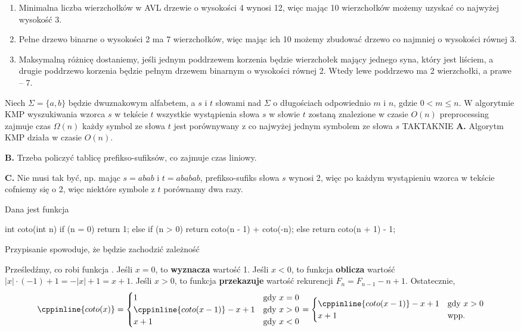 \begin{solutions}
    \begin{enumerate}[\bf A.]
        \item Minimalna liczba wierzchołków w AVL drzewie o wysokości 4 wynosi 12, więc mając 10 wierzchołków możemy uzyskać co najwyżej wysokość 3.

        \item Pełne drzewo binarne o wysokości 2 ma 7 wierzchołków, więc mając ich 10 możemy zbudować drzewo co najmniej o wysokości równej 3.

        \item Maksymalną różnicę dostaniemy, jeśli jednym poddrzewem korzenia będzie wierzchołek mający jednego syna, który jest liściem, a drugie poddrzewo korzenia będzie pełnym drzewem binarnym o wysokości równej 2. Wtedy lewe poddrzewo ma 2 wierzchołki, a prawe -- 7.
    \end{enumerate}

    \sol Niech $\Sigma = \{a, b\} $ będzie dwuznakowym alfabetem, a $s$ i $t$ słowami nad $\Sigma$ o długościach odpowiednio $m$ i $n$, gdzie $0 < m \leq n$. W algorytmie KMP wyszukiwania wzorca $s$ w tekście $t$
    \answerss
    {wszystkie wystąpienia słowa $s$ w słowie $t$ zostaną znalezione w czasie $O(n)$}
    {preprocessing zajmuje czas $\Omega (n)$}
    {każdy symbol ze słowa $t$ jest porównywany z co najwyżej jednym symbolem ze słowa $s$}
    {TAK}{TAK}{NIE}
    \textbf{A.} Algorytm KMP działa w czasie $O(n)$.

    \textbf{B.} Trzeba policzyć tablicę prefikso-sufiksów, co zajmuje czas liniowy.

    \textbf{C.} Nie musi tak być, np. mając $s=abab$ i $t=ababab$, prefikso-sufiks słowa $s$ wynosi 2, więc po każdym wystąpieniu wzorca w tekście cofniemy się o 2, więc niektóre symbole z $t$ porównamy dwa razy.

    \sol Dana jest funkcja
    \begin{cpp}
        int coto(int n) {
            if (n = 0)
                return 1;
            else if (n > 0)
                return coto(n - 1) + coto(-n);
            else
                return coto(n + 1) - 1;
        }
    \end{cpp}
    Przypisanie  spowoduje, że będzie zachodzić zależność
    
    Prześledźmy, co robi funkcja . Jeśli $x=0$, to \textbf{wyznacza} wartość 1. Jeśli $x<0$, to funkcja \textbf{oblicza} wartość $|x|\cdot(-1)+1=-|x|+1=x+1$. Jeśli $x>0$, to funkcja \textbf{przekazuje} wartość rekurencji $F_n=F_{n-1}-n+1$. Ostatecznie,
    $$
    \cppinline{coto(x)}=\begin{cases}
        1 & \text{gdy } x=0 \\
        \cppinline{coto(x-1)}-x+1 & \text{gdy } x>0 \\
        x+1 & \text{gdy } x<0
    \end{cases}=\begin{cases}
        \cppinline{coto(x-1)}-x+1 & \text{gdy } x>0 \\
        x+1 & \text{wpp.}
    \end{cases}
    $$


\end{solutions}
